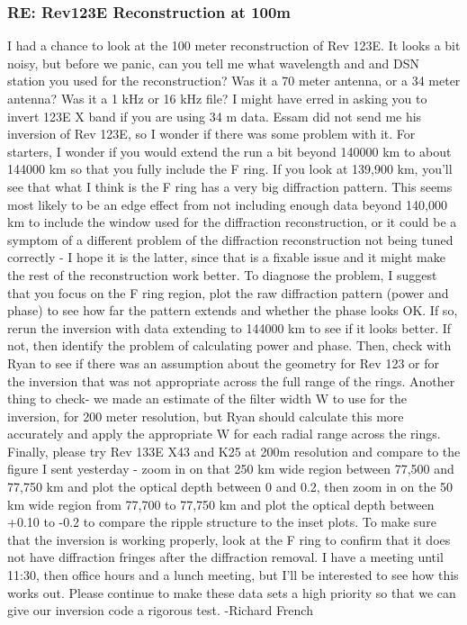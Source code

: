 \documentclass[crop=false,class=article,oneside]{standalone}
\begin{document}
\subsubsection{\footnotesize RE: Rev123E Reconstruction at 100m}
I had a chance to look at the 100 meter reconstruction of Rev 123E. It looks a bit noisy, but before we panic, can you tell me what wavelength and and DSN station you used for the reconstruction? Was it a 70 meter antenna, or a 34 meter antenna? Was it a 1 kHz or 16 kHz file? I might have erred in asking you to invert 123E X band if you are using  34 m data. Essam did not send me his inversion of Rev 123E, so I wonder if there was some problem with it. For starters, I wonder if you would extend the run a bit beyond 140000 km to about 144000 km so that you fully include the F ring. If you look at 139,900 km, you'll see that what I think is the F ring has a very big diffraction pattern. This seems most likely to be an edge effect from not including enough data beyond 140,000 km to include the window used for the diffraction reconstruction, or it could be a symptom of a different problem of the diffraction reconstruction not being tuned correctly - I hope it is the latter, since that is a fixable issue and it might make the rest of the reconstruction work better. To diagnose the problem, I suggest that you focus on the F ring region, plot the raw diffraction pattern (power and phase) to see how far the pattern extends and whether the phase looks OK. If so, rerun the inversion with data extending to 144000 km to see if it looks better. If not, then identify the problem of calculating power and phase. Then, check with Ryan to see if there was an assumption about the geometry for Rev 123 or for the inversion that was not appropriate across the full range of the rings. Another thing to check- we made an estimate of the filter width W to use for the inversion, for 200 meter resolution, but Ryan should calculate this more accurately and apply the appropriate W for each radial range across the rings. Finally, please try Rev 133E X43 and K25 at 200m resolution and compare to the figure I sent yesterday - zoom in on that 250 km wide region between 77,500 and 77,750 km and plot the optical depth between 0 and 0.2, then zoom in on the 50 km wide region from 77,700 to 77,750 km and plot the optical depth between +0.10 to -0.2 to compare the ripple structure to the inset plots. To make sure that the inversion is working properly, look at the F ring to confirm that it does not have diffraction fringes after the diffraction removal. I have a meeting until 11:30, then office hours and a lunch meeting, but I'll be interested to see how this works out. Please continue to make these data sets a high priority so that we can give our inversion code a rigorous test. -Richard French\par
\end{document}
